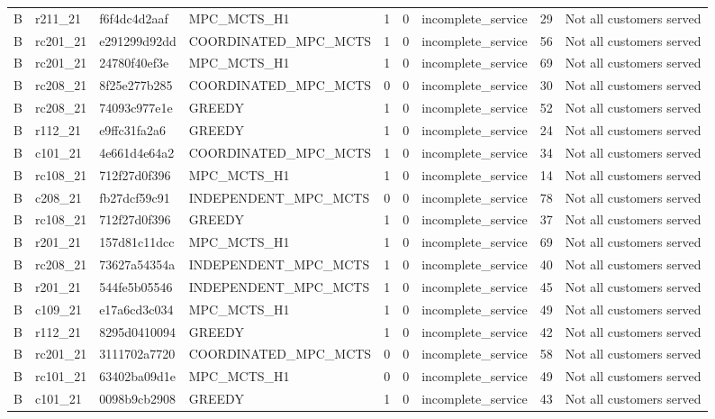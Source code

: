\begin{table}
{\begin{tabular}{llllrrlrl}
B & r211\_21 & f6f4dc4d2aaf & MPC\_MCTS\_H1 & 1 & 0 & incomplete\_service & 29 & Not all customers served \\
B & rc201\_21 & e291299d92dd & COORDINATED\_MPC\_MCTS & 1 & 0 & incomplete\_service & 56 & Not all customers served \\
B & rc201\_21 & 24780f40ef3e & MPC\_MCTS\_H1 & 1 & 0 & incomplete\_service & 69 & Not all customers served \\
B & rc208\_21 & 8f25e277b285 & COORDINATED\_MPC\_MCTS & 0 & 0 & incomplete\_service & 30 & Not all customers served \\
B & rc208\_21 & 74093c977e1e & GREEDY & 1 & 0 & incomplete\_service & 52 & Not all customers served \\
B & r112\_21 & e9ffc31fa2a6 & GREEDY & 1 & 0 & incomplete\_service & 24 & Not all customers served \\
B & c101\_21 & 4e661d4e64a2 & COORDINATED\_MPC\_MCTS & 1 & 0 & incomplete\_service & 34 & Not all customers served \\
B & rc108\_21 & 712f27d0f396 & MPC\_MCTS\_H1 & 1 & 0 & incomplete\_service & 14 & Not all customers served \\
B & c208\_21 & fb27dcf59c91 & INDEPENDENT\_MPC\_MCTS & 0 & 0 & incomplete\_service & 78 & Not all customers served \\
B & rc108\_21 & 712f27d0f396 & GREEDY & 1 & 0 & incomplete\_service & 37 & Not all customers served \\
B & r201\_21 & 157d81c11dcc & MPC\_MCTS\_H1 & 1 & 0 & incomplete\_service & 69 & Not all customers served \\
B & rc208\_21 & 73627a54354a & INDEPENDENT\_MPC\_MCTS & 1 & 0 & incomplete\_service & 40 & Not all customers served \\
B & r201\_21 & 544fe5b05546 & INDEPENDENT\_MPC\_MCTS & 1 & 0 & incomplete\_service & 45 & Not all customers served \\
B & c109\_21 & e17a6cd3c034 & MPC\_MCTS\_H1 & 1 & 0 & incomplete\_service & 49 & Not all customers served \\
B & r112\_21 & 8295d0410094 & GREEDY & 1 & 0 & incomplete\_service & 42 & Not all customers served \\
B & rc201\_21 & 3111702a7720 & COORDINATED\_MPC\_MCTS & 0 & 0 & incomplete\_service & 58 & Not all customers served \\
B & rc101\_21 & 63402ba09d1e & MPC\_MCTS\_H1 & 0 & 0 & incomplete\_service & 49 & Not all customers served \\
B & c101\_21 & 0098b9cb2908 & GREEDY & 1 & 0 & incomplete\_service & 43 & Not all customers served \\

\end{tabular}}
\end{table}
